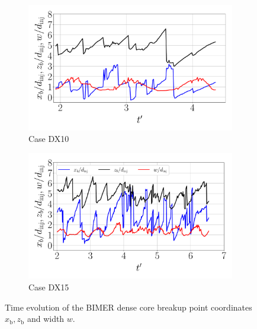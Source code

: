 \begin{figure}[ht]
\flushleft
\begin{subfigure}[b]{0.45\textwidth}
	\centering
   \includegraphics[scale=0.25]{./part3_applications/figures_ch8_resolved/results_dense_core_modeling/instant_xb_zb_w_DX10}
   \vspace*{-0.30in}
   \caption{Case DX10}
   \label{fig:instant_xb_zb_BIMER_w_DX10}
\end{subfigure}
\hfill
\begin{subfigure}[b]{0.45\textwidth}
	\centering
   \includegraphics[scale=0.25]{./part3_applications/figures_ch8_resolved/results_dense_core_modeling/instant_xb_zb_w_DX15}
   \vspace*{-0.30in}
   \caption{Case DX15}
   \label{fig:instant_xb_zb_BIMER_w_DX15} 
\end{subfigure}
	\vspace{-0.1in}
   \caption{Time evolution of the BIMER dense core breakup point coordinates $x_\mathrm{b}, z_\mathrm{b}$ and width $w$.}
\label{fig:BIMER_xb_zb_w_evolution}
\end{figure}

